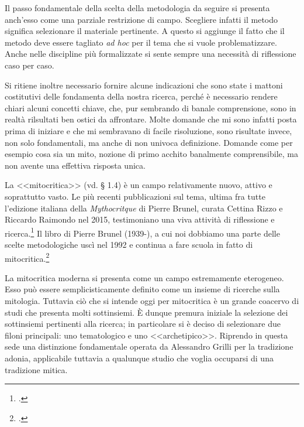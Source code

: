 \documentclass[12pt,a4paper,openright, oneside]{book}
\begin{document}
Il passo fondamentale della scelta della metodologia da seguire si presenta anch'esso come una parziale restrizione di campo. Scegliere infatti il metodo significa selezionare  il materiale pertinente. A questo si aggiunge il fatto che il metodo deve essere tagliato \textit{ad hoc} per il tema che si vuole problematizzare. Anche nelle discipline più formalizzate si sente sempre una necessità di riflessione caso per caso.

 Si ritiene inoltre necessario fornire alcune indicazioni che sono state i mattoni costitutivi delle fondamenta della nostra ricerca, perché è necessario rendere chiari alcuni concetti chiave, che, pur sembrando di banale comprensione, sono in realtà rilsultati ben ostici da affrontare. Molte domande che mi sono infatti posta prima di iniziare e che mi sembravano di facile risoluzione, sono risultate invece, non solo fondamentali, ma anche di non univoca definizione. Domande come per esempio cosa sia un mito, nozione di primo acchito banalmente comprensibile, ma non avente una effettiva risposta unica.  

La <<mitocritica>> (vd. § 1.4) è un campo relativamente nuovo, attivo e soprattutto vasto. Le più recenti pubblicazioni sul tema, ultima fra tutte l'edizione italiana della \textit{Mythocritque} di Pierre Brunel, curata Cettina Rizzo e Riccardo Raimondo nel 2015, testimoniano una viva attività di riflessione e ricerca.\footcite{Brunel} Il libro di Pierre Brunel (1939-), a cui noi dobbiamo una parte delle scelte metodologiche uscì nel 1992 e continua a fare scuola in fatto di mitocritica.\footcite{Brunel1}

La mitocritica moderna si presenta come un campo estremamente eterogeneo. Esso può essere semplicisticamente definito come un insieme di ricerche sulla mitologia. Tuttavia ciò che si intende oggi per mitocritica è un grande coacervo di studi che presenta molti sottinsiemi.
È dunque premura iniziale la selezione dei sottinsiemi pertinenti alla ricerca; in particolare si è deciso di selezionare due filoni principali: uno tematologico e uno <<archetipico>>.
 Riprendo in questa sede una distinzione fondamentale operata da Alessandro Grilli per la tradizione adonia, applicabile tuttavia a qualunque studio che voglia occuparsi di una tradizione mitica.
\end{document}
